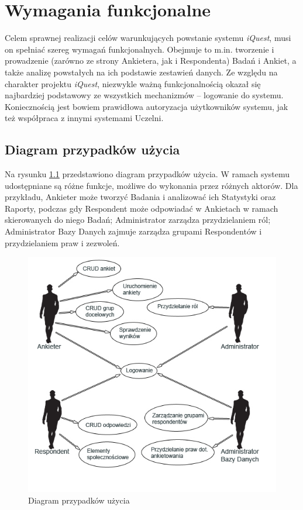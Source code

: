 \chapter{Wymagania funkcjonalne}
\label{Chapter3}

Celem sprawnej realizacji celów warunkujących powstanie systemu \textit{iQuest}, musi on spełniać szereg wymagań funkcjonalnych. Obejmuje to m.in. tworzenie i prowadzenie (zarówno ze strony Ankietera, jak i Respondenta) Badań i Ankiet, a także analizę powstałych na ich podstawie zestawień danych. Ze względu na charakter projektu \textit{iQuest}, niezwykle ważną funkcjonalnością okazał się najbardziej podstawowy ze wszystkich mechanizmów -- logowanie do systemu. Koniecznością jest bowiem prawidłowa autoryzacja użytkowników systemu, jak też współpraca z innymi systemami Uczelni.

\section{Diagram przypadków użycia}
\label{Chapter31}

Na rysunku \ref{rys:UseCaseView} przedstawiono diagram przypadków użycia. W ramach systemu udostępniane są różne funkcje, możliwe do wykonania przez różnych aktorów. Dla przykładu, Ankieter może tworzyć Badania i analizować ich Statystyki oraz Raporty, podczas gdy Respondent może odpowiadać w Ankietach w ramach skierowanych do niego Badań; Administrator zarządza przydzielaniem ról; Administrator Bazy Danych zajmuje zarządza grupami Respondentów i przydzielaniem praw i zezwoleń.

\begin{figure}[H]
\centering\includegraphics[width=0.9*\textwidth]{figures/UseCaseView}
\caption{Diagram przypadków użycia}\label{rys:UseCaseView}
\end{figure}

